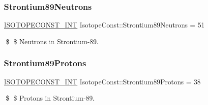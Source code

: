 \subsubsection{\texorpdfstring{Strontium89\+Neutrons}{Strontium89Neutrons}}
{\footnotesize\ttfamily \mbox{\hyperlink{group___isotope_const-_macros_ga5f18360b3e99483a35c32d789e62621c}{I\+S\+O\+T\+O\+P\+E\+C\+O\+N\+S\+T\+\_\+\+I\+NT}} Isotope\+Const\+::\+Strontium89\+Neutrons = 51}

\$ \$ Neutrons in Strontium-\/89. \mbox{\label{group___isotope_const-_strontium-_sr89_gaf6c53ad64e2b0722dbbd54be029bcb81}} 
\subsubsection{\texorpdfstring{Strontium89\+Protons}{Strontium89Protons}}
{\footnotesize\ttfamily \mbox{\hyperlink{group___isotope_const-_macros_ga5f18360b3e99483a35c32d789e62621c}{I\+S\+O\+T\+O\+P\+E\+C\+O\+N\+S\+T\+\_\+\+I\+NT}} Isotope\+Const\+::\+Strontium89\+Protons = 38}

\$ \$ Protons in Strontium-\/89. 